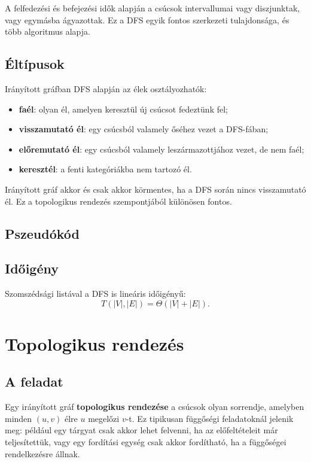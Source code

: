 A felfedezési és befejezési idők alapján a csúcsok intervallumai vagy diszjunktak, vagy egymásba ágyazottak. Ez a DFS egyik fontos szerkezeti tulajdonsága, és több algoritmus alapja.

\subsection{Éltípusok}

Irányított gráfban DFS alapján az élek osztályozhatók:

\begin{itemize}
  \item \textbf{faél}: olyan él, amelyen keresztül új csúcsot fedeztünk fel;
  \item \textbf{visszamutató él}: egy csúcsból valamely őséhez vezet a DFS-fában;
  \item \textbf{előremutató él}: egy csúcsból valamely leszármazottjához vezet, de nem faél;
  \item \textbf{keresztél}: a fenti kategóriákba nem tartozó él.
\end{itemize}

Irányított gráf akkor és csak akkor körmentes, ha a DFS során nincs visszamutató él. Ez a topologikus rendezés szempontjából különösen fontos.

\subsection{Pszeudókód}


\subsection{Időigény}

Szomszédsági listával a DFS is lineáris időigényű:
\[
T(|V|,|E|)=\Theta(|V|+|E|).
\]

\section{Topologikus rendezés}

\subsection{A feladat}

Egy irányított gráf \textbf{topologikus rendezése} a csúcsok olyan sorrendje, amelyben minden $(u,v)$ élre $u$ megelőzi $v$-t. Ez tipikusan függőségi feladatoknál jelenik meg: például egy tárgyat csak akkor lehet felvenni, ha az előfeltételeit már teljesítettük, vagy egy fordítási egység csak akkor fordítható, ha a függőségei rendelkezésre állnak.

